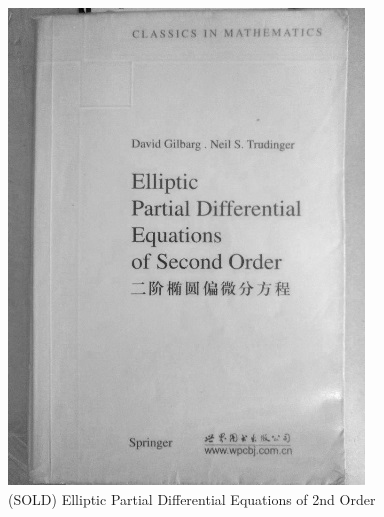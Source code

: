 \documentclass[t]{beamer}
\newcommand{\htarget}[2]{\hypertarget{#1}{#2}}
\begin{document}
\begin{frame}\htarget{ePDE}{} \begin{center}
\includegraphics[height=0.8\textheight]{Elliptic_Partial_Differential_Equations_of_2nd_order_sold.jpg} \\
(SOLD) Elliptic Partial Differential Equations of 2nd Order
\end{center} \end{frame}
\end{document}
